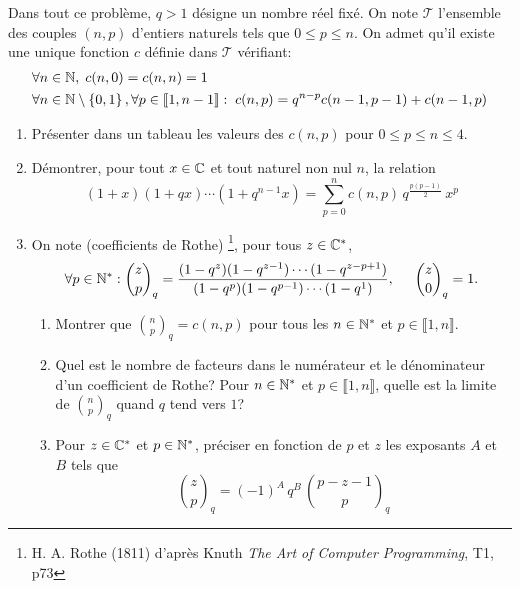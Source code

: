 Dans tout ce problème, $q>1$ désigne un nombre réel fixé.\newline
On note $\mathcal{T}$ l'ensemble des couples $(n,p)$ d'entiers naturels tels que $0\leq p \leq n$. On admet qu'il existe une unique fonction $c$ définie dans $\mathcal{T}$ vérifiant:
\begin{align*}
  &\forall n \in \mathbb{N},\; c(n,0) = c(n,n) = 1 \\
  &\forall n \in \mathbb{N}\setminus \left\lbrace 0, 1\right\rbrace, \forall p\in \llbracket 1, n-1 \rrbracket:\;
  c(n,p) = q^{n-p}c(n-1,p-1) + c(n-1,p)
\end{align*}
\begin{enumerate}
  \item Présenter dans un tableau les valeurs des $c(n,p)$ pour $0\leq p \leq n \leq 4$.
  \item Démontrer, pour tout $x\in \mathbb{C}$ et tout naturel non nul $n$, la relation
\begin{displaymath}
(1+x)(1+qx)\cdots (1+q^{n-1}x) = 
\sum_{p=0}^{n}c(n,p)\,q^{\frac{p(p-1)}{2}}\,x^p
\end{displaymath}
\item On note (coefficients de Rothe) \footnote{H. A. Rothe (1811) d'après Knuth \emph{The Art of Computer Programming}, T1, p73}, pour tous $z\in \mathbb{C}^*$,
\begin{displaymath}
  \forall p\in \mathbb{N}^*: {\binom{z}{p}}_q = \frac{(1-q^z)(1-q^{z-1})\cdots (1-q^{z-p+1})}{(1-q^p)(1-q^{p-1})\cdots (1-q^{1})}, \hspace{0.5cm} {\binom{z}{0}}_q = 1.
\end{displaymath}
\begin{enumerate}
  \item Montrer que ${\binom{n}{p}}_q = c(n,p)$ pour tous les $n\in \mathbb{N}^*$ et $p\in \llbracket 1,n\rrbracket$.
  \item Quel est le nombre de facteurs dans le numérateur et le dénominateur d'un coefficient de Rothe? 
  Pour $n\in \mathbb{N}^*$ et $p\in \llbracket 1,n\rrbracket$, quelle est la limite de ${\binom{n}{p}}_q$ quand $q$ tend vers $1$?
  \item Pour $z\in \mathbb{C}^*$ et $p\in \mathbb{N}^*$, préciser en fonction de $p$ et $z$ les exposants $A$ et $B$ tels que 
\begin{displaymath}
  {\binom{z}{p}}_q = (-1)^{A}\, q^{B}\, {\binom{p-z-1}{p}}_q
\end{displaymath}

\end{enumerate}

\end{enumerate}
